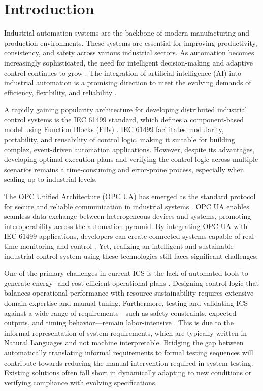 \documentclass[conference]{IEEEtran}
\begin{document}
\section{Introduction}
\label{Introduction}

Industrial automation systems are the backbone of modern manufacturing and production environments. These systems are essential for improving productivity, consistency, and safety across various industrial sectors. As automation becomes increasingly sophisticated, the need for intelligent decision-making and adaptive control continues to grow \cite{khan2020management}. The integration of artificial intelligence (AI) into industrial automation is a promising direction to meet the evolving demands of efficiency, flexibility, and reliability \cite{mathew2023artificial}.

A rapidly gaining popularity architecture for developing distributed industrial control systems is the IEC 61499 standard, which defines a component-based model using Function Blocks (FBs) \cite{iec61499part12012}. IEC 61499 facilitates modularity, portability, and reusability of control logic, making it suitable for building complex, event-driven automation applications. However, despite its advantages, developing optimal execution plans and verifying the control logic across multiple scenarios remains a time-consuming and error-prone process, especially when scaling up to industrial levels.

The OPC Unified Architecture (OPC UA) has emerged as the standard protocol for secure and reliable communication in industrial systems \cite{OPC_UA_2023}. OPC UA enables seamless data exchange between heterogeneous devices and systems, promoting interoperability across the automation pyramid. By integrating OPC UA with IEC 61499 applications, developers can create connected systems capable of real-time monitoring and control \cite{majumder2023proposal}. Yet, realizing an intelligent and sustainable industrial control system using these technologies still faces significant challenges.

One of the primary challenges in current ICS is the lack of automated tools to generate energy- and cost-efficient operational plans \cite{benedetti2017energy}. Designing control logic that balances operational performance with resource sustainability requires extensive domain expertise and manual tuning. Furthermore, testing and validating ICS against a wide range of requirements---such as safety constraints, expected outputs, and timing behavior---remain labor-intensive \cite{antao2018requirements}. This is due to the informal representation of system requirements, which are typically written in Natural Languages and not machine interpretable. Bridging the gap between automatically translating informal requirements to formal testing sequences will contribute towards reducing the manual intervention required in system testing. Existing solutions often fall short in dynamically adapting to new conditions or verifying compliance with evolving specifications.
\end{document}
